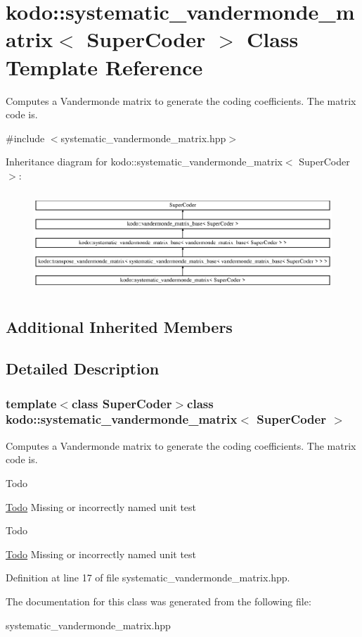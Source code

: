 \hypertarget{classkodo_1_1systematic__vandermonde__matrix}{\section{kodo\-:\-:systematic\-\_\-vandermonde\-\_\-matrix$<$ Super\-Coder $>$ Class Template Reference}
\label{classkodo_1_1systematic__vandermonde__matrix}
}


Computes a Vandermonde matrix to generate the coding coefficients. The matrix code is.  




{\ttfamily \#include $<$systematic\-\_\-vandermonde\-\_\-matrix.\-hpp$>$}

Inheritance diagram for kodo\-:\-:systematic\-\_\-vandermonde\-\_\-matrix$<$ Super\-Coder $>$\-:\begin{figure}[H]
\begin{center}
\leavevmode
\includegraphics[height=3.783784cm]{classkodo_1_1systematic__vandermonde__matrix}
\end{center}
\end{figure}
\subsection*{Additional Inherited Members}


\subsection{Detailed Description}
\subsubsection*{template$<$class Super\-Coder$>$class kodo\-::systematic\-\_\-vandermonde\-\_\-matrix$<$ Super\-Coder $>$}

Computes a Vandermonde matrix to generate the coding coefficients. The matrix code is. 

\begin{DoxyRefDesc}{Todo}
\item[\hyperlink{todo__todo000047}{Todo}]Missing or incorrectly named unit test \end{DoxyRefDesc}
\begin{DoxyRefDesc}{Todo}
\item[\hyperlink{todo__todo000048}{Todo}]Missing or incorrectly named unit test \end{DoxyRefDesc}


Definition at line 17 of file systematic\-\_\-vandermonde\-\_\-matrix.\-hpp.



The documentation for this class was generated from the following file\-:\begin{DoxyCompactItemize}
\item 
systematic\-\_\-vandermonde\-\_\-matrix.\-hpp\end{DoxyCompactItemize}
